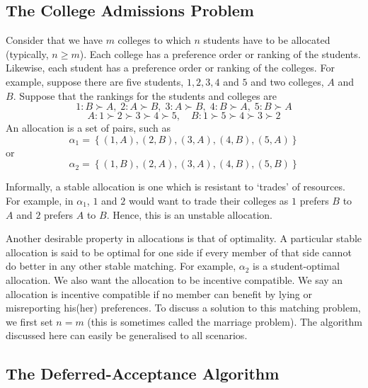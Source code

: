 \documentclass{article}
\theoremstyle{definition}
\begin{document}
\subsection{The College Admissions Problem}

Consider that we have $m$ colleges to which $n$ students have to be allocated (typically, $n \geq m$). Each college has a preference order or ranking of the students. Likewise, each student has a preference order or ranking of the colleges. For example, suppose there are five students, $1,2,3,4$ and $5$ and two colleges, $A$ and $B$. Suppose that the rankings for the students and colleges are
\[
    1 \colon B \succ A, \; 2 \colon A \succ B, \; 3 \colon A \succ B, \; 4 \colon B \succ A, \; 5 \colon B \succ A
\]
\[
    A \colon 1 \succ 2 \succ 3 \succ 4 \succ 5, \quad B \colon 1 \succ 5 \succ 4 \succ 3 \succ 2
\]
An allocation is a set of pairs, such as
\[
    \alpha_1 = \left\{ (1,A) , (2,B) , (3,A) , (4,B) , (5,A) \right\}
\]
or
\[
    \alpha_2 = \left\{ (1,B) , (2,A) , (3,A) , (4,B) , (5,B) \right\}
\]

Informally, a stable allocation is one which is resistant to `trades' of resources. For example, in $\alpha_1$, $1$ and $2$ would want to trade their colleges as $1$ prefers $B$ to $A$ and $2$ prefers $A$ to $B$. Hence, this is an unstable allocation. \medskip

Another desirable property in allocations is that of optimality. A particular stable allocation is said to be optimal for one side if every member of that side cannot do better in any other stable matching. For example, $\alpha_2$ is a student-optimal allocation. We also want the allocation to be incentive compatible. We say an allocation is incentive compatible if no member can benefit by lying or misreporting his(her) preferences. To discuss a solution to this matching problem, we first set $n=m$ (this is sometimes called the marriage problem). The algorithm discussed here can easily be generalised to all scenarios.

\subsection{The Deferred-Acceptance Algorithm}
\end{document}
